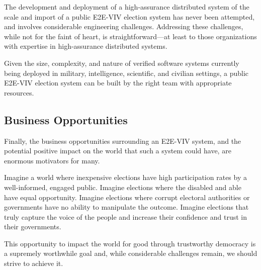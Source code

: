 The development and deployment of a high-assurance distributed system
of the scale and import of a public E2E-VIV election system has never
been attempted, and involves considerable engineering
challenges. Addressing these challenges, while not for the faint of
heart, is straightforward---at least to those organizations with
expertise in high-assurance distributed systems.

Given the size, complexity, and nature of verified software systems
currently being deployed in military, intelligence, scientific, and
civilian settings, a public E2E-VIV election system can be built by
the right team with appropriate resources.

\subsection{Business Opportunities}

Finally, the business opportunities surrounding an E2E-VIV
system, and the potential positive impact on the world that such a
system could have, are enormous motivators for many.

Imagine a world where inexpensive elections have high participation
rates by a well-informed, engaged public. Imagine elections where the
disabled and able have equal opportunity. Imagine elections where
corrupt electoral authorities or governments have no ability to
manipulate the outcome. Imagine elections that truly capture the voice
of the people and increase their confidence and trust in their
governments.

This opportunity to impact the world for good through trustworthy
democracy is a supremely worthwhile goal and, while considerable
challenges remain, we should strive to achieve it.
